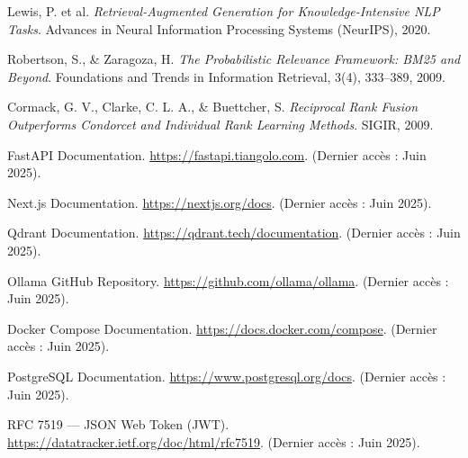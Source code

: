\documentclass[12pt,a4paper]{report}
\begin{document}
\begin{enumerate}[label={[\arabic*]}, leftmargin=2.5em]
  \item Lewis, P. et al. \textit{Retrieval-Augmented Generation for
  Knowledge-Intensive NLP Tasks}. Advances in Neural Information Processing Systems
  (NeurIPS), 2020.

  \item Robertson, S., \& Zaragoza, H. \textit{The Probabilistic Relevance Framework:
  BM25 and Beyond}. Foundations and Trends in Information Retrieval, 3(4), 333--389, 2009.

  \item Cormack, G. V., Clarke, C. L. A., \& Buettcher, S. \textit{Reciprocal Rank
  Fusion Outperforms Condorcet and Individual Rank Learning Methods}. SIGIR, 2009.

  \item FastAPI Documentation. \url{https://fastapi.tiangolo.com}. (Dernier accès :
  Juin 2025).

  \item Next.js Documentation. \url{https://nextjs.org/docs}. (Dernier accès :
  Juin 2025).

  \item Qdrant Documentation. \url{https://qdrant.tech/documentation}. (Dernier accès :
  Juin 2025).

  \item Ollama GitHub Repository. \url{https://github.com/ollama/ollama}. (Dernier
  accès : Juin 2025).

  \item Docker Compose Documentation.
  \url{https://docs.docker.com/compose}. (Dernier accès : Juin 2025).

  \item PostgreSQL Documentation. \url{https://www.postgresql.org/docs}. (Dernier
  accès : Juin 2025).

  \item RFC 7519 — JSON Web Token (JWT). \url{https://datatracker.ietf.org/doc/html/rfc7519}.
  (Dernier accès : Juin 2025).
\end{enumerate}
\end{document}

